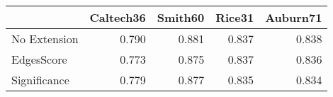 \begin{tabular}{lrrrr}
\toprule
{} & Caltech36 & Smith60 & Rice31 & Auburn71 \\
\midrule
No Extension &     0.790 &   0.881 &  0.837 &    0.838 \\
EdgesScore   &     0.773 &   0.875 &  0.837 &    0.836 \\
Significance &     0.779 &   0.877 &  0.835 &    0.834 \\
\bottomrule
\end{tabular}
